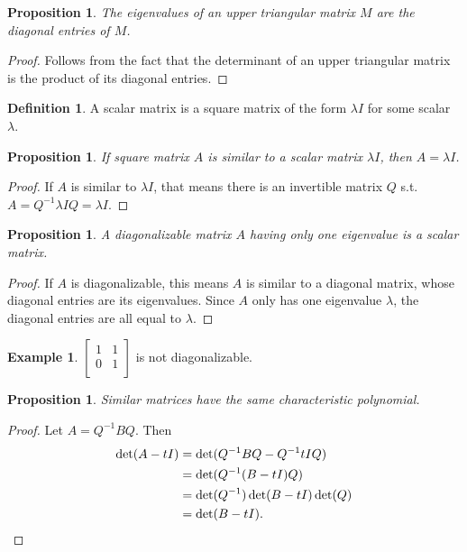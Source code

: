 \documentclass[12pt]{article}
\theoremstyle{plain}
\newtheorem{proposition}[theorem]{Proposition}
\theoremstyle{definition}
\newtheorem{definition}[theorem]{Definition}
\newtheorem{example}[theorem]{Example}
\theoremstyle{remark}
\begin{document}
\begin{proposition}
The eigenvalues of an upper triangular matrix $M$ are the diagonal entries of $M$.
\end{proposition}

\begin{proof}
Follows from the fact that the determinant of an upper triangular matrix is the product of its diagonal entries.
\end{proof}

\begin{definition}
A scalar matrix is a square matrix of the form $\lambda I$ for some scalar $\lambda$.
\end{definition}

\begin{proposition}
If square matrix $A$ is similar to a scalar matrix $\lambda I$, then $A = \lambda I$.
\end{proposition}

\begin{proof}
If $A$ is similar to $\lambda I$, that means there is an invertible matrix $Q$ s.t. $A = Q^{-1} \lambda I Q = \lambda I$.
\end{proof}

\begin{proposition}
A diagonalizable matrix $A$ having only one eigenvalue is a scalar matrix.
\end{proposition}

\begin{proof}
If $A$ is diagonalizable, this means $A$ is similar to a diagonal matrix, whose diagonal entries are its eigenvalues. Since $A$ only has one eigenvalue $\lambda$, the diagonal entries are all equal to $\lambda$.
\end{proof}

\begin{example}
$\begin{bmatrix}
1 & 1 \\
0 & 1 \\
\end{bmatrix}$ is not diagonalizable.
\end{example}

\begin{proposition}
Similar matrices have the same characteristic polynomial.
\end{proposition}

\begin{proof}
Let $A = Q^{-1} B Q$. Then 
\begin{align*}
\det(A - tI) &= \det(Q^{-1} B Q - Q^{-1} tI Q) \\
&= \det(Q^{-1}(B - tI)Q) \\
&= \det(Q^{-1})\det(B - tI)\det(Q) \\
&= \det(B - tI).\qedhere
\end{align*}
\end{proof}
\end{document}
